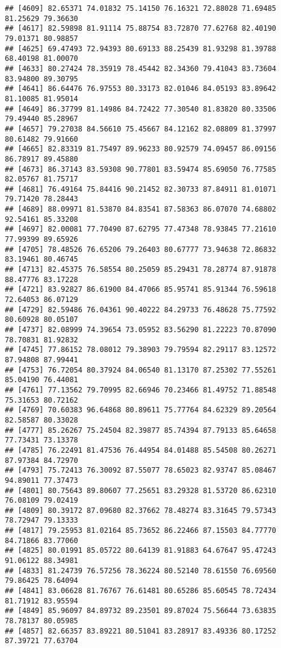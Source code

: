 \documentclass[
]{article}
\begin{document}
\begin{verbatim}
## [4609] 82.65371 74.01832 75.14150 76.16321 72.88028 71.69485 81.25629 79.36630
## [4617] 82.59898 81.91114 75.88754 83.72870 77.62768 82.40190 79.01371 80.98857
## [4625] 69.47493 72.94393 80.69133 88.25439 81.93298 81.39788 68.40198 81.00070
## [4633] 80.27424 78.35919 78.45442 82.34360 79.41043 83.73604 83.94800 89.30795
## [4641] 86.64476 76.97553 80.33173 82.01046 84.05193 83.89642 81.10085 81.95014
## [4649] 86.37799 81.14986 84.72422 77.30540 81.83820 80.33506 79.49440 85.28967
## [4657] 79.27038 84.56610 75.45667 84.12162 82.08809 81.37997 80.61482 79.91660
## [4665] 82.83319 81.75497 89.96233 80.92579 74.09457 86.09156 86.78917 89.45880
## [4673] 86.37143 83.59308 90.77801 83.59474 85.69050 76.77585 82.05767 81.75717
## [4681] 76.49164 75.84416 90.21452 82.30733 87.84911 81.01071 79.71420 78.28443
## [4689] 88.09971 81.53870 84.83541 87.58363 86.07070 74.68802 92.54161 85.33208
## [4697] 82.00081 77.70490 87.62795 77.47348 78.93845 77.21610 77.99399 89.65926
## [4705] 78.48526 76.65206 79.26403 80.67777 73.94638 72.86832 83.19461 80.46745
## [4713] 82.45375 76.58554 80.25059 85.29431 78.28774 87.91878 88.47776 83.17228
## [4721] 83.92827 86.61900 84.47066 85.95741 85.91344 76.59618 72.64053 86.07129
## [4729] 82.59486 76.04361 90.40222 84.29733 76.48628 75.77592 80.60928 80.05107
## [4737] 82.08999 74.39654 73.05952 83.56290 81.22223 70.87090 78.70831 81.92832
## [4745] 77.86152 78.08012 79.38903 79.79594 82.29117 83.12572 87.94808 87.99441
## [4753] 76.72054 80.37924 84.06540 81.13170 87.25302 77.55261 85.04190 76.44081
## [4761] 77.13562 79.70995 82.66946 70.23466 81.49752 71.88548 75.31653 80.72162
## [4769] 70.60383 96.64868 80.89611 75.77764 84.62329 89.20564 82.58587 80.33028
## [4777] 85.26267 75.24504 82.39877 85.74394 87.79133 85.64658 77.73431 73.13378
## [4785] 76.22491 81.47536 76.44954 84.01488 85.54508 80.26271 87.97384 84.72970
## [4793] 75.72413 76.30092 87.55077 78.65023 82.93747 85.08467 94.89011 77.37473
## [4801] 80.75643 89.80607 77.25651 83.29328 81.53720 86.62310 76.08109 79.02419
## [4809] 80.39172 87.09680 82.37662 78.48274 83.31645 79.57343 78.72947 79.13333
## [4817] 79.25953 81.02164 85.73652 86.22466 87.15503 84.77770 84.71866 83.77060
## [4825] 80.01991 85.05722 80.64139 81.91883 64.67647 95.47243 91.06122 88.34981
## [4833] 81.24739 76.57256 78.36224 80.52140 78.61550 76.69560 79.86425 78.64094
## [4841] 83.06628 81.76767 76.61481 80.65286 85.60545 78.72434 81.71912 83.95594
## [4849] 85.96097 84.89732 89.23501 89.87024 75.56644 73.63835 78.78137 80.05985
## [4857] 82.66357 83.89221 80.51041 83.28917 83.49336 80.17252 87.39721 77.63704

\end{verbatim}
\end{document}
